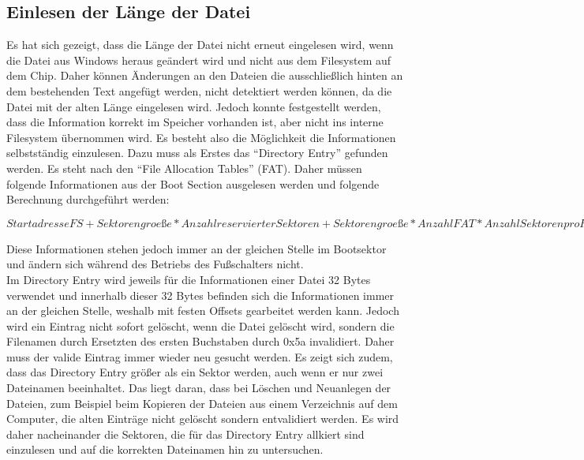 \subsection{Einlesen der Länge der Datei}
Es hat sich gezeigt, dass die Länge der Datei nicht erneut eingelesen wird, wenn die Datei aus Windows heraus geändert wird und nicht aus dem Filesystem auf dem Chip. Daher können Änderungen an den Dateien die ausschließlich hinten an dem bestehenden Text angefügt werden, nicht detektiert werden können, da die Datei mit der alten Länge eingelesen wird. Jedoch konnte festgestellt werden, dass die Information korrekt im Speicher vorhanden ist, aber nicht ins interne Filesystem übernommen wird. Es besteht also die Möglichkeit die Informationen selbstständig einzulesen. Dazu muss als Erstes das ``Directory Entry'' gefunden werden. Es steht nach den ``File Allocation Tables'' (FAT). Daher müssen folgende Informationen aus der Boot Section ausgelesen werden und folgende Berechnung durchgeführt werden: 

\(Startadresse FS + Sektorengroeße*Anzahl reservierter Sektoren + Sektorengroeße*Anzahl FAT*Anzahl Sektoren pro FAT = Startadresse FS + Sektorengröße * (Anzahl reservierter Sektoren + Anzahl FAT*Anzahl Sektoren pro FAT)\)

Diese Informationen stehen jedoch immer an der gleichen Stelle im Bootsektor und ändern sich während des Betriebs des Fußschalters nicht. \\
Im Directory Entry wird jeweils für die Informationen einer Datei 32 Bytes verwendet und innerhalb dieser 32 Bytes befinden sich die Informationen immer an der gleichen Stelle, weshalb mit festen Offsets gearbeitet werden kann. Jedoch wird ein Eintrag nicht sofort gelöscht, wenn die Datei gelöscht wird, sondern die Filenamen durch Ersetzten des ersten Buchstaben durch 0x5a invalidiert. Daher muss der valide Eintrag immer wieder neu gesucht werden. Es zeigt sich zudem, dass das Directory Entry größer als ein Sektor werden, auch wenn er nur zwei Dateinamen beeinhaltet. Das liegt daran, dass bei Löschen und Neuanlegen der Dateien, zum Beispiel beim Kopieren der Dateien aus einem Verzeichnis auf dem Computer, die alten Einträge nicht gelöscht sondern entvalidiert werden. Es wird daher nacheinander die Sektoren, die für das Directory Entry allkiert sind einzulesen und auf die korrekten Dateinamen hin zu untersuchen.

